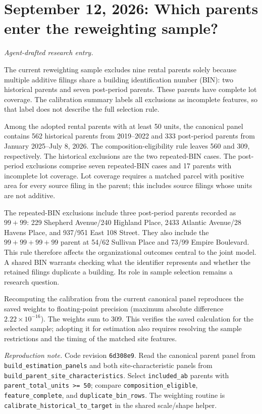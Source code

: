 \clearpage
\section*{September 12, 2026: Which parents enter the reweighting sample?}
\textit{Agent-drafted research entry.}

The current reweighting sample excludes nine rental parents solely because
multiple additive filings share a building identification number (BIN): two
historical parents and seven post-period parents. These parents have complete
lot coverage. The calibration summary labels all exclusions as incomplete
features, so that label does not describe the full selection rule.

Among the adopted rental parents with at least 50 units, the canonical panel
contains 562 historical parents from 2019--2022 and 333 post-period parents from
January 2025--July 8, 2026. The composition-eligibility rule leaves 560 and 309,
respectively. The historical exclusions are the two repeated-BIN cases. The
post-period exclusions comprise seven repeated-BIN cases and 17 parents with
incomplete lot coverage. Lot coverage requires a matched parcel with positive
area for every source filing in the parent; this includes source filings whose
units are not additive.

The repeated-BIN exclusions include three post-period parents recorded as
$99+99$: 229 Shepherd Avenue/240 Highland Place, 2433 Atlantic Avenue/28 Havens
Place, and 937/951 East 108 Street. They also include the $99+99+99+99$ parent at
54/62 Sullivan Place and 73/99 Empire Boulevard. This rule therefore affects
the organizational outcomes central to the joint model. A shared BIN warrants
checking what the identifier represents and whether the retained filings
duplicate a building. Its role in sample selection remains a research question.

Recomputing the calibration from the current canonical panel reproduces the
saved weights to floating-point precision (maximum absolute difference
$2.22\times10^{-16}$). The weights sum to 309. This verifies the saved
calculation for the selected sample; adopting it for estimation also requires
resolving the sample restrictions and the timing of the matched site features.

\textit{Reproduction note.} Code revision \texttt{6d308e9}. Read the canonical
parent panel from \texttt{build\_estimation\_panels} and both site-characteristic
panels from \texttt{build\_parent\_site\_characteristics}. Select
\texttt{included\_ab} parents with \texttt{parent\_total\_units >= 50}; compare
\texttt{composition\_eligible}, \texttt{feature\_complete}, and
\texttt{duplicate\_bin\_rows}. The weighting routine is
\texttt{calibrate\_historical\_to\_target} in the shared scale/shape helper.

